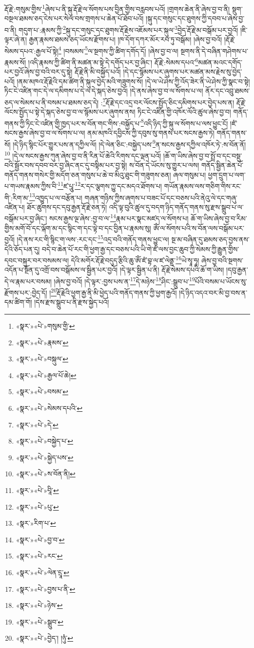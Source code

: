 རྡོ་རྗེ་:གསུམ་གྱིས་\footnote{«སྣར་»«པེ་»གསུམ་གྱི་}ཞེས་པ་ནི་སྐུ་རྡོ་རྗེ་ལ་སོགས་པས་བྱིན་གྱིས་བརླབས་པའོ། །གྲགས་ཆེན་ནི་ཞེས་བྱ་བ་ནི། སྡུག་བསྔལ་ཐམས་ཅད་ངེས་པར་སེལ་བས་གྲགས་པ་ཆེན་པོ་ཐོབ་པའོ། །སྐུ་དང་གསུང་དང་ཐུགས་ཀྱི་དབབ་པ་ཞེས་བྱ་བ་ནི། གདུག་པ་:རྣམས་ཀྱི་\footnote{«སྣར་»«པེ་»རྣམས་}སྐུ་དང་གསུང་དང་ཐུགས་རྡོ་རྗེས་འཇོམས་པར་སྐུལ་\footnote{«སྣར་»«པེ་»བསྐུལ་}བྱེད་རྡོ་རྗེ་མ་བསྒོམ་པར་བྱའོ། །ཇི་ལྟར་ཞེ་ན། རྒྱན་རྣམས་ཐམས་ཅད་ཡོངས་རྫོགས་པ། །ཁ་དོག་དཀར་མོར་རབ་ཏུ་བསྒོམ། །ཞེས་བྱ་བའོ། །རྡོ་རྗེ་སེམས་དཔའ་:རྒྱལ་པོ་སྟེ།\footnote{«སྣར་»«པེ་»རྒྱལ་པོ་ཆེ།} །བསམས་\footnote{«སྣར་»«པེ་»བསམ་}ལ་སྔགས་ཀྱི་ཚིག་དགོད་དོ། །ཞེས་བྱ་བ་ལ། སྔགས་ནི་དེ་བཞིན་གཤེགས་པ་རྣམས་སོ། །འདི་རྣམས་ཀྱི་ཚིག་ནི་མཚན་མ་སྟེ་དེ་དགོད་པར་བྱ་ཞིང་། རྡོ་རྗེ་:སེམས་དཔའ་\footnote{«སྣར་»«པེ་»སེམས་དཔའི་}མཚན་མའང་དགོད་པར་བྱའོ་ཞེས་བྱ་བའི་བར་དུ་སྟེ། རྡོ་རྗེ་ནི་མི་བསྐྱོད་པའོ། །དེ་དང་སྙོམས་པར་ཞུགས་པར་མཚན་མས་རྗེས་སུ་བྱེད་པའོ། །ནམ་མཁའ་རྡོ་རྗེའི་དམ་ཚིག་ནི་སྐུལ་བྱེད་མའི་གཟུགས་སོ། །དེ་ལ་ཡེ་ཤེས་ཀྱི་འོད་ཟེར་ནི་ཡེ་ཤེས་ཀྱི་སྣང་བ་སྟེ། ཏིང་ངེ་འཛིན་གང་དེ་ལ་དམིགས་པ་དེ་ལ་དེ་སྐད་ཅེས་བྱའོ། །དེ་ནས་ཞེས་བྱ་བ་ལ་སོགས་པ་ལ། ནོར་དང་འབྲུ་ཐམས་ཅད་ལ་སེམས་པ་ནི་བསམ་པ་ཐམས་ཅད་དེ། :\footnote{«སྣར་»«པེ་»དེ་}རྡོ་རྗེ་དང་འདྲ་བར་ལོངས་སྤྱོད་ཅིང་དམིགས་པར་བྱེད་པས་ན། རྡོ་རྗེ་ལོངས་སྤྱོད་པ་སྟེ་དེ་སྐད་ཅེས་བྱ་བ་ལ་སྙོམས་པར་ཞུགས་ནས། ཏིང་ངེ་འཛིན་གྱི་འཁོར་ལོའི་ཚུལ་ཞེས་བྱ་བ། གནོད་གནས་ཀྱི་ཏིང་ངེ་འཛིན་གྱི་ཁྱད་པར་ས་བོན་གང་གིས་:བསྐྱོད་པ་\footnote{«སྣར་»«པེ་»བསྐྱེད་པ་}འདི་ཉིད་ཀྱི་སྐུ་ལ་སོགས་པ་ལས་ཕྱུང་ངོ། །ཛཾ་སངས་རྒྱས་ཞེས་བྱ་བ་ལ་སོགས་པ་ལ། ནམ་མཁའི་དབྱིངས་ཀྱི་དབུས་སུ་གནས་པར་སངས་རྒྱས་ཏེ། གནོད་གནས་སོ། །དེ་ཉིད་སྙིང་པོར་གྱུར་པས་ན་དཀྱིལ་ལོ། །དེ་ལེན་ཅིང་:བསྐྱེད་པས་\footnote{«སྣར་»«པེ་»སྐྱེད་པས་}ན་སངས་རྒྱས་དཀྱིལ་འཁོར་ཏེ་:ས་བོན་ནོ།\footnote{«སྣར་»«པེ་»ས་བོན་ནི།} །དེ་ལ་སངས་རྒྱས་ཀུན་ཞེས་བྱ་བ་ནི་རིན་པོ་ཆེའི་རིགས་དང་ལྡན་པའོ། །ཆོ་ག་ཡིས་ཞེས་བྱ་བ་སྤྲོ་བ་དང་བསྡུ་བའི་སྦྱོར་བས་དབབ་བར་བྱ་ཞིང་ནང་དུ་བསྟིམ་པར་བྱ་སྟེ། ས་བོན་དེ་ཡོངས་སུ་གྱུར་པ་ལས། གནོད་སྦྱིན་ཆེན་པོ་གནོད་གནས་གསེར་གྱི་མདོག་ཅན་གསུས་པ་ཆེ་བ་མིའུ་ཐུང་གི་གཟུགས་ཅན། ཞལ་གསུམ་པ། ཕྱག་དྲུག་པ་ལག་པ་གཡས་རྣམས་ཀྱིས་བི་\footnote{«སྣར་»«པེ་»བཱི་}ཛ་པཱུ་\footnote{«སྣར་»«པེ་»པུ་}ར་དང་ལྕགས་ཀྱུ་དང་མདའ་ཐོགས་པ། གཡོན་རྣམས་ལས་གཅིག་གིས་རང་གི་:རིག་མ་\footnote{«སྣར་»རིག་པ་}འཁྱུད་པ་ལ་བརྩོན་པ། གཞན་གཉིས་ཀྱིས་ཞགས་པ་བཟང་པོ་དང་བཅས་པའི་ནེའུ་ལེ་དང་གཞུ་འཛིན་པ། ཐོར་ཚུགས་དང་དབུ་རྒྱན་རྡོ་རྗེ་ཅན་ཏེ། འདི་ལྟ་བུའི་ཚུལ་དུ་བདག་ཉིད་གནོད་གནས་སུ་རྫས་སྒྲུབ་པ་ལ་བསྒོམ་པར་བྱ་ཞིང་། སངས་རྒྱས་ལྔ་ཞེས་:བྱ་བ་ལ་\footnote{«སྣར་»«པེ་»བྱ་བ་}རྣམ་པར་སྣང་མཛད་ལ་སོགས་པ། ཆོ་ག་ཡིས་ཞེས་བྱ་བ་རིམ་གྱིས་མགོ་བོ་དང་ལྐོག་མ་དང་སྙིང་ག་དང་ལྟེ་བ་དང་བྱིན་པ་རྣམས་སུ། ཨོཾ་ལ་སོགས་པའི་ས་བོན་ལས་བསྒོམ་པར་བྱའོ། །དེ་ནས་རང་གི་སྙིང་ག་ལས་:རང་དང་\footnote{«སྣར་»«པེ་»རང་}འདྲ་བའི་གནོད་གནས་ཕྱུང་ལ། སྔ་མ་བཞིན་དུ་ཐམས་ཅད་བྱས་ནས་དེའི་ཅོད་པན་དུ། བདེ་བ་ཆེན་པོ་རང་གི་ཕྱག་རྒྱ་དང་བཅས་པའི་ཡི་གེ་ཛཾ་ལས་བྱང་ཆུབ་ཀྱི་སེམས་ཀྱི་རྒྱུན་གྱིས་དབང་བསྐུར་བར་བསམས་ལ། དེའི་མགོར་རྡོ་རྗེ་བདུད་རྩིའི་ཆུ་ཨོཾ་ཛཾ་བྷ་ལ་ཛ་ལེནྡྲ་\footnote{«སྣར་»«པེ་»ལེན་དྲཱ་}ཡེ་སྭཱ་ཧཱ། ཞེས་བྱ་བའི་སྔགས་འདོན་པ་སྔོན་དུ་འགྲོ་བས་བསྒོམས་ལ་སྦྱིན་པར་བྱའོ། །དེ་ལྟར་སྦྱིན་པ་ནི། རྡོ་རྗེ་སེམས་དཔའི་ཆོ་ག་ཡིས། །དབུ་རྒྱན་དེ་ལ་རྣམ་པར་བསམ། །ཞེས་བྱ་བའོ། །དེ་ལྟར་:བྱས་པས་ན་\footnote{«སྣར་»«པེ་»བྱས་པ་ནི་}དེ་མཉེས་\footnote{«སྣར་»«པེ་»ཉེས་}ཤིང་:སྒྲུབ་པ་\footnote{«སྣར་»«པེ་»སྒྲུབ་}པོའི་བསམ་པ་ཡོངས་སུ་རྫོགས་པར་:བྱེད་དོ། །\footnote{«སྣར་»«པེ་»བྱེད་། །ཉུཾ་}རྡོ་རྗེའི་ཕྱག་རྒྱ་ནི་མི་ཕྱེད་པའི་གནོད་གནས་ཀྱི་ཕྱག་རྒྱའོ། །དེ་ཉིད་འདའ་བར་མི་བྱ་བས་ན་དམ་ཚིག་གོ། །དེས་རྫས་སྒྲུབ་པ་ནི་རྫས་སྐྱེད་པའོ། 